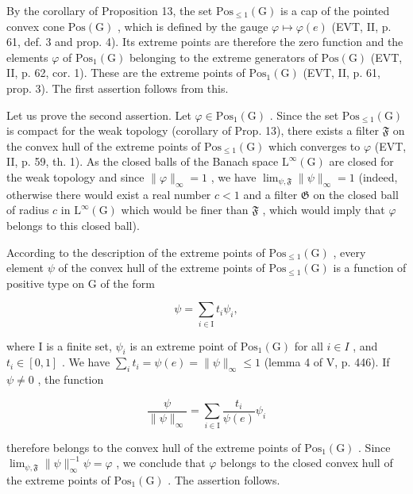 By the corollary of Proposition 13, the set \(\mathrm{Pos}_{\leqslant 1}(\mathrm{G})\) is a cap of the pointed convex cone \(\mathrm{Pos}(\mathrm{G})\) , which is defined by the gauge \(\varphi \mapsto \varphi(e)\) (EVT, II, p. 61, def. 3 and prop. 4). Its extreme points are therefore the zero function and the elements \(\varphi\) of \(\mathrm{Pos}_1(\mathrm{G})\) belonging to the extreme generators of \(\mathrm{Pos}(\mathrm{G})\) (EVT, II, p. 62, cor. 1). These are the extreme points of \(\mathrm{Pos}_1(\mathrm{G})\) (EVT, II, p. 61, prop. 3). The first assertion follows from this.

Let us prove the second assertion. Let \(\varphi\in\mathrm{Pos}_{1}(\mathrm{G})\) . Since the set \(\mathrm{Pos}_{\leqslant 1}(\mathrm{G})\) is compact for the weak topology (corollary of Prop. 13), there exists a filter \(\mathfrak{F}\) on the convex hull of the extreme points of \(\mathrm{Pos}_{\leqslant 1}(\mathrm{G})\) which converges to \(\varphi\) (EVT, II, p. 59, th. 1). As the closed balls of the Banach space \(\mathrm{L}^{\infty}(\mathrm{G})\) are closed for the weak topology and since \(\|\varphi\|_{\infty}=1\) , we have \(\lim_{\psi,\mathfrak{F}}\|\psi\|_{\infty}=1\) (indeed, otherwise there would exist a real number \(c<1\) and a filter \(\mathfrak{G}\) on the closed ball of radius \(c\) in \(\mathrm{L}^{\infty}(\mathrm{G})\) which would be finer than \(\mathfrak{F}\) , which would imply that \(\varphi\) belongs to this closed ball).

According to the description of the extreme points of \(\mathrm{Pos}_{\leqslant1}(\mathrm{G})\) , every element \(\psi\) of the convex hull of the extreme points of \(\mathrm{Pos}_{\leqslant1}(\mathrm{G})\) is a function of positive type on G of the form

\[
\psi = \sum_ {i \in \mathrm{I}} t _ {i} \psi_ {i},
\]

where I is a finite set, \(\psi_{i}\) is an extreme point of \(\mathrm{Pos}_{1}(\mathrm{G})\) for all \(i \in I\) , and \(t_{i} \in [0,1]\) . We have \(\sum_{i} t_{i} = \psi(e) = \|\psi\|_{\infty} \leqslant 1\) (lemma 4 of V, p. 446). If \(\psi \neq 0\) , the function

\[
\frac {\psi}{\| \psi \| _ {\infty}} = \sum_ {i \in \mathrm{I}} \frac {t _ {i}}{\psi (e)} \psi_ {i}
\]

therefore belongs to the convex hull of the extreme points of \(\mathrm{Pos}_{1}(\mathrm{G})\) . Since \(\lim_{\psi,\mathfrak{F}}\|\psi\|_{\infty}^{-1}\psi=\varphi\) , we conclude that \(\varphi\) belongs to the closed convex hull of the extreme points of \(\mathrm{Pos}_{1}(\mathrm{G})\) . The assertion follows.

